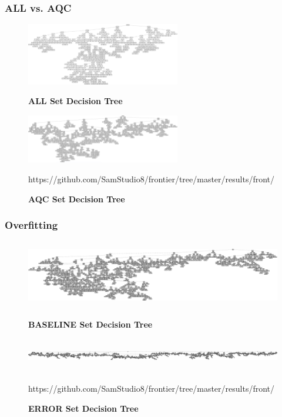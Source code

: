 \documentclass{beamer}
\begin{document}
\begin{frame}[t]
\frametitle{ALL vs. AQC}
    \begin{figure}[htbp!]
        \centering
        \includegraphics[width=0.6\textwidth]{img/ALL_ALL_1.png}
        \tiny{\caption[all-all-1]{\textbf{ALL Set Decision Tree}}}

        \includegraphics[width=0.6\textwidth]{img/ALL_AQC_1.png}
        \tiny{\caption[all-aqc-1]{\textbf{AQC Set Decision Tree}}}

        \tiny{https://github.com/SamStudio8/frontier/tree/master/results/front/}
    \end{figure}
\end{frame}

\begin{frame}[t]
    \frametitle{Overfitting}
    \begin{figure}[htbp!]
        \centering
        \includegraphics[width=\textheight,height=3cm]{img/ALL_BASELINE_1.png}
        \tiny{\caption[all-baseline-1]{\textbf{BASELINE Set Decision Tree}}}

        \includegraphics[width=\textheight,height=1.5cm]{img/ALL_ERROR_1.png}
        \tiny{\caption[all-error-1]{\textbf{ERROR Set Decision Tree}}}

        \tiny{https://github.com/SamStudio8/frontier/tree/master/results/front/}
    \end{figure}
\end{frame}
\end{document}
